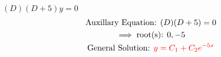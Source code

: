 \item [8.] $(D)(D+5)y=0$
\begin{gather*}
    \text{Auxillary Equation: }(D)(D+5)=0\\
    \implies \text{root(s): } 0,-5\\
    \text{General Solution: } \textcolor{red}{y=C_1+C_2e^{-5x}}
\end{gather*}